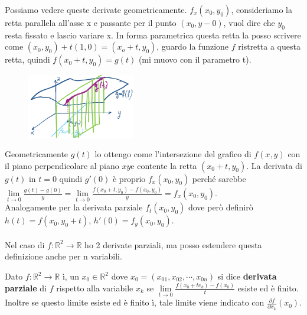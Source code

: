 \hspace{-15pt}Possiamo vedere queste derivate geometricamente.
$f_x(x_0,y_0)$, consideriamo la retta parallela all'asse x e passante per il punto $(x_0,y-0)$, vuol dire che $y_0$ resta fissato e lascio variare x. In forma parametrica questa retta la posso scrivere come $(x_0,y_0) + t(1,0) = (x_o + t, y_0)$, guardo la funzione $f$ ristretta a questa retta, quindi $f(x_0 + t, y_0) = g(t)$ (mi muovo con il parametro t).\\
\begin{figure}
    \vspace{-10pt}
    \centering
    \includegraphics[width=4.7cm]{images/derivata-parziale-geometricamente.png}
\end{figure}
Geometricamente $g(t)$ lo ottengo come l'intersezione del grafico di $f(x,y)$ con il piano perpendicolare al piano $xy$e contente la retta $(x_0+t,y_0)$. La derivata di $g(t)$ in $t=0$ quindi $g'(0)$ è proprio $f_x (x_0,y_0)$ perché sarebbe $\lim\limits_{t\to 0}\frac{g(t) - g(0)}{y} = \lim\limits_{t\to 0}\frac{f(x_0+t, y_0) - f(x_0,y_0)}{y} = f_x(x_0,y_0)$.\\
Analogamente per la derivata parziale $f_t(x_0,y_0)$ dove però definirò $h(t) = f(x_0, y_0+t)$, $h'(0) = f_y(x_0,y_0)$.\\\\
Nel caso di $f: \mathbb{R}^2 \to \mathbb{R}$ ho 2 derivate parziali, ma posso estendere questa definizione anche per n variabili.

\begin{definition}
Dato $f: \mathbb{R}^2 \to \mathbb{R}$ ì, un $x_0 \in \mathbb{R}^2$ dove $x_0 = (x_{01}, x_{02}, \cdots, x_{0n})$ si dice \textbf{derivata parziale} di $f$ rispetto alla variabile $x_k$ se $\lim\limits_{t\to 0 }\frac{f(x_0 + te_k) - f(x_0)}{t}$ esiste  ed è finito. Inoltre se questo limite esiste ed è finito ì, tale limite viene indicato con $\frac{\partial f}{\partial x_k}(x_0)$. 
\end{definition}

